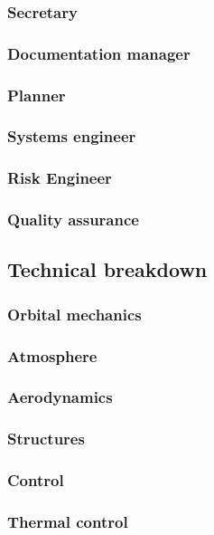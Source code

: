 \subsubsection{Secretary}\label{subsec:Secretary}


\subsubsection{Documentation manager}\label{subsec:D_and_A}


\subsubsection{Planner}\label{subsec:Planner}


\subsubsection{Systems engineer}\label{subsec:SE}


\subsubsection{Risk Engineer}\label{subsec:RiskEng}


\subsubsection{Quality assurance}\label{subsec:QA}



\subsection{Technical breakdown}

\subsubsection{Orbital mechanics}\label{subsec:orbit}

\subsubsection{Atmosphere}\label{subsec:atmos}

\subsubsection{Aerodynamics}\label{subsec:aero}

\subsubsection{Structures}\label{subsec:struct}

\subsubsection{Control}\label{subsec:control}

\subsubsection{Thermal control}\label{subsec:therm}
